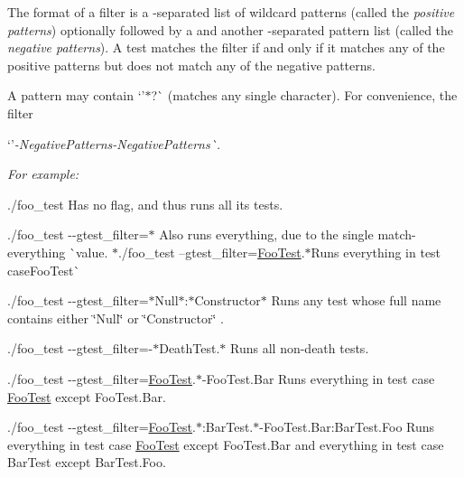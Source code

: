 The format of a filter is a \textquotesingle{}{\ttfamily \+:}\textquotesingle{}-\/separated list of wildcard patterns (called the {\itshape positive patterns}) optionally followed by a \textquotesingle{}{\ttfamily -\/}\textquotesingle{} and another \textquotesingle{}{\ttfamily \+:}\textquotesingle{}-\/separated pattern list (called the {\itshape negative patterns}). A test matches the filter if and only if it matches any of the positive patterns but does not match any of the negative patterns.

A pattern may contain `'$\ast$\textquotesingle{}?\textquotesingle{}\`{} (matches any single character). For convenience, the filter

`'{\itshape -\/\+Negative\+Patterns\textquotesingle{}-\/\+Negative\+Patterns\textquotesingle{}\`{}.}

{\itshape For example\+:}

{\itshape 
\begin{DoxyItemize}
\item {\ttfamily ./foo\+\_\+test} Has no flag, and thus runs all its tests.
\item {\ttfamily ./foo\+\_\+test -\/-\/gtest\+\_\+filter=$\ast$} Also runs everything, due to the single match-\/everything \`{}{\ttfamily value. $\ast$}./foo\+\_\+test --gtest\+\_\+filter=\mbox{\hyperlink{class_foo_test}{Foo\+Test}}.$\ast${\ttfamily Runs everything in test case}Foo\+Test\`{}
\item {\ttfamily ./foo\+\_\+test -\/-\/gtest\+\_\+filter=$\ast$\+Null$\ast$\+:$\ast$\+Constructor$\ast$} Runs any test whose full name contains either {\ttfamily \char`\"{}\+Null\char`\"{}} or {\ttfamily \char`\"{}\+Constructor\char`\"{}} .
\item {\ttfamily ./foo\+\_\+test -\/-\/gtest\+\_\+filter=-\/$\ast$\+Death\+Test.$\ast$} Runs all non-\/death tests.
\item {\ttfamily ./foo\+\_\+test -\/-\/gtest\+\_\+filter=\mbox{\hyperlink{class_foo_test}{Foo\+Test}}.$\ast$-\/\+Foo\+Test.Bar} Runs everything in test case {\ttfamily \mbox{\hyperlink{class_foo_test}{Foo\+Test}}} except {\ttfamily Foo\+Test.\+Bar}.
\item {\ttfamily ./foo\+\_\+test -\/-\/gtest\+\_\+filter=\mbox{\hyperlink{class_foo_test}{Foo\+Test}}.$\ast$\+:Bar\+Test.$\ast$-\/\+Foo\+Test.Bar\+:Bar\+Test.\+Foo} Runs everything in test case {\ttfamily \mbox{\hyperlink{class_foo_test}{Foo\+Test}}} except {\ttfamily Foo\+Test.\+Bar} and everything in test case {\ttfamily Bar\+Test} except {\ttfamily Bar\+Test.\+Foo}.
\end{DoxyItemize}}

